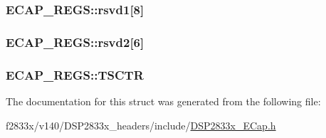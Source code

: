 \subsubsection[{rsvd1}]{ E\+C\+A\+P\+\_\+\+R\+E\+G\+S\+::rsvd1\mbox{[}8\mbox{]}}\label{struct_e_c_a_p___r_e_g_s_a37da0f873b57fe54332a26839355000b}
\hypertarget{struct_e_c_a_p___r_e_g_s_a7f2037bf2181e25aa04fa346139e7ae9}{}
\subsubsection[{rsvd2}]{ E\+C\+A\+P\+\_\+\+R\+E\+G\+S\+::rsvd2\mbox{[}6\mbox{]}}\label{struct_e_c_a_p___r_e_g_s_a7f2037bf2181e25aa04fa346139e7ae9}
\hypertarget{struct_e_c_a_p___r_e_g_s_aaec359f7445364075ac3bc2120dc34de}{}
\subsubsection[{T\+S\+C\+T\+R}]{ E\+C\+A\+P\+\_\+\+R\+E\+G\+S\+::\+T\+S\+C\+T\+R}\label{struct_e_c_a_p___r_e_g_s_aaec359f7445364075ac3bc2120dc34de}


The documentation for this struct was generated from the following file\+:\begin{DoxyCompactItemize}
\item 
f2833x/v140/\+D\+S\+P2833x\+\_\+headers/include/\hyperlink{_d_s_p2833x___e_cap_8h}{D\+S\+P2833x\+\_\+\+E\+Cap.\+h}\end{DoxyCompactItemize}
